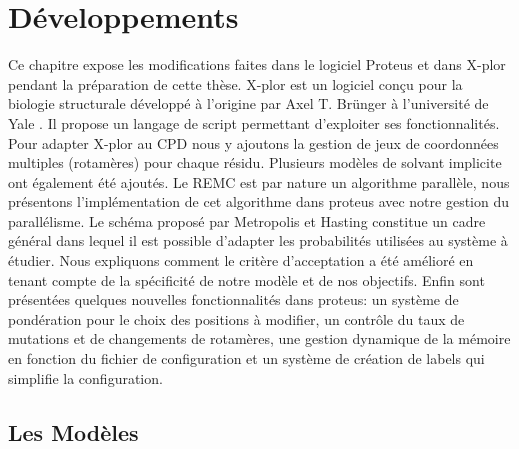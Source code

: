 \chapter{Développements}
\label{chap:developpements}

Ce chapitre expose les modifications faites dans le logiciel Proteus et dans X-plor pendant la préparation de cette thèse.
X-plor est un logiciel conçu pour la biologie structurale développé à l'origine par Axel T. Brünger à l'université de Yale \cite{Brünger92}. Il propose un langage de script permettant d'exploiter ses fonctionnalités. Pour adapter X-plor au CPD nous y ajoutons la gestion de jeux de coordonnées multiples (rotamères) pour chaque résidu. Plusieurs modèles de solvant implicite ont également été ajoutés. Le REMC est par nature un algorithme parallèle, nous présentons l'implémentation de cet algorithme dans proteus avec notre gestion du parallélisme. Le schéma proposé par Metropolis et Hasting constitue un cadre général dans lequel il est possible d'adapter les probabilités utilisées au système à étudier. Nous expliquons comment le critère d'acceptation a été amélioré en tenant compte de la spécificité de notre modèle et de nos objectifs. Enfin sont présentées quelques nouvelles fonctionnalités dans proteus: un système de pondération pour le choix des positions à modifier, un contrôle du taux de mutations et de changements de rotamères, une gestion dynamique de la mémoire en fonction du fichier de configuration et un système de création de labels qui simplifie la configuration.  


\section{Les Modèles }


